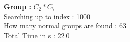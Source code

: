\textbf{Group : $C_2*C_7$}\\
Searching up to index : 1000\\
How many normal groups are found : 63\\
Total Time in s : 22.0\\
